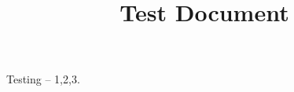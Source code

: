 \documentclass{article}
\title{Test Document}
\begin{document}
\maketitle
Testing -- 1,2,3.
\end{document}
